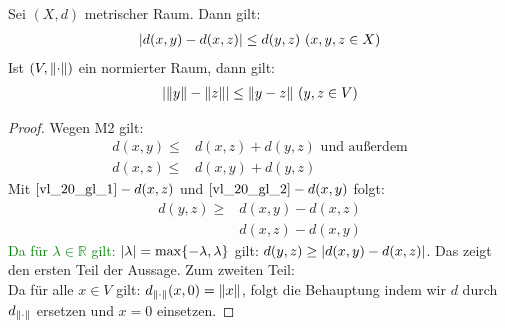 \begin{Proposition}{%
	Sei $(X,d)$ metrischer Raum. Dann gilt:
	\begin{align*}
		\abs{d(x,y)- d(x,z)} \leq d(y,z) \text{ } (x,y,z \in X)
	\end{align*}
	Ist $(V, \norm{\cdot})$ ein normierter Raum, dann gilt:
	\begin{align*}
		\abs{\norm{y} - \norm{z} } \leq \norm{y -z} \text{ } (y, z \in V)
	\end{align*}
}\end{Proposition}

\begin{proof}
	Wegen M2 gilt:
	\begin{align} \label{vl_20_gl_1}
		d(x,y) \leq & d(x,z) + d(y,z) \text{ und außerdem} \\
		d(x,z) \leq & d(x,y) + d(y,z) \label{vl_20_gl_2}
	\end{align}
	Mit $\ref{vl_20_gl_1}- d(x,z)$ und $\ref{vl_20_gl_2}-d(x,y)$ folgt:
	\begin{align*}
		d(y,z) \geq & d(x,y) - d(x,z) \\
			& d(x,z) - d(x,y)
	\end{align*} 
	\textcolor{green}{Da für $\lambda \in \mathbb{R}$ gilt: $\abs{\lambda} = 
		\max\{-\lambda, \lambda\}$} gilt: $d(y,z) \geq \abs{d(x,y) - d(x,z)}$.
		Das zeigt den ersten Teil der Aussage. Zum zweiten Teil:\\
		Da für alle $x \in V$ gilt: $d_{\norm{\cdot}} (x,0) = \norm{x}$, 
		folgt die Behauptung indem wir $d$ durch $d_{\norm{\cdot}}$ ersetzen und 
		$x = 0$ einsetzen.
\end{proof}